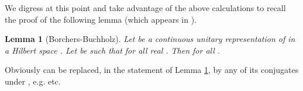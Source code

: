 \documentclass[a4paper,a4paper]{article}
\newtheorem{lemma}{Lemma}[section]
\def\HH{{\cal H}}
\begin{document}
We digress at this point and take advantage of the above calculations
to recall the proof of the following lemma (which appears in \cite{BB}).

\begin{lemma}[Borchers-Buchholz]
\label{bobu}
Let \coordHE{} be a continuous unitary representation of \coordHE{} in
a Hilbert space \myHighlight{$\HH$}\coordHE{}. Let \myHighlight{$\Psi \in \HH$}\coordHE{}
be such that \coordHE{} for all real \coordHE{}.
Then \coordHE{} for all \coordHE{}.
\end{lemma}
\noindent Obviously \coordHE{} can be replaced, in the statement of
Lemma \ref{bobu}, by any of its conjugates under \coordHE{}, e.g. \coordHE{} etc.
\end{document}
